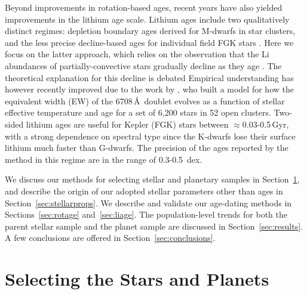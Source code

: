 \documentclass[11pt,twocolumn,tighten]{aastex63}
\begin{document}
Beyond improvements in rotation-based ages, recent years have also
yielded improvements in the lithium age scale.
Lithium ages include two qualitatively distinct regimes: depletion
boundary ages derived for M-dwarfs in star clusters, and the less
precise decline-based ages for individual field FGK stars
\citep{Soderblom_2010}.  Here we focus on the latter approach, which
relies on the observation that the Li abundances of
partially-convective stars gradually decline as they age
\citep[e.g.][]{2005A&A...442..615S}.  The theoretical explanation for
this decline is debated
\citep[e.g.][]{1995ApJ...441..865C,2010ApJ...716.1269D,2019MNRAS.485.4052C}
Empirical understanding has however recently improved due to the work
by \citet{Jeffries_2023}, who built a model for how the equivalent
width (EW) of the  6708\,\AA\ doublet evolves as a function
of stellar effective temperature and age for a set of 6{,}200 stars in
52 open clusters.  Two-sided lithium ages are useful for Kepler (FGK)
stars between $\approx$0.03-0.5\,Gyr, with a strong dependence on
spectral type since the K-dwarfs lose their surface lithium much
faster than G-dwarfs.  The precision of the ages reported by the
\citet{Jeffries_2023} method in this regime are in the range of
0.3-0.5~dex.

We discuss our methods for selecting stellar and planetary samples in
Section~\ref{sec:selection}, and describe
the origin of our adopted stellar parameters other than ages in
Section~\ref{sec:stellarprops}.
We describe and validate our age-dating methods in
Sections~\ref{sec:rotage} and~\ref{sec:liage}.
The population-level trends for both the parent stellar sample and
the planet sample are discussed in Section~\ref{sec:results}.
A few conclusions are offered in Section~\ref{sec:conclusions}.


\section{Selecting the Stars and Planets}
\label{sec:selection}
\end{document}
